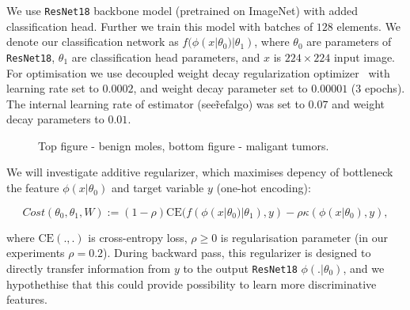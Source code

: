 \documentclass{article}
\newcommand{\CE}{\mathrm{CE}}
\begin{document}
We use \verb|ResNet18| backbone model (pretrained on ImageNet) with added classification head. Further we train this model with batches of $128$ elements.
We denote our classification network as $f(\phi(x|\theta_{0})|\theta_{1})$, where $\theta_{0}$ are parameters of \verb|ResNet18|, $\theta_{1}$ are classification head parameters, and $x$ is $224\times 224$ input image.
For optimisation we use decoupled weight decay regularization optimizer~\cite{Loshchilov2019DecoupledWD} with learning rate set to $0.0002$, and weight decay parameter set to $0.00001$ ($3$ epochs).
The internal learning rate of estimator (see\~ref{algo}) was set to $0.07$ and weight decay parameters to $0.01$.

\begin{figure}%
	\centering
	\qquad
	\caption{Top figure - benign moles, bottom figure - maligant tumors.}
	\label{fig:Pneumonia_dataset_examples}
\end{figure}


We will investigate additive regularizer, which maximises depency of bottleneck the feature $\phi(x|\theta_{0})$ and target variable $y$ (one-hot encoding): 


\begin{equation}
\label{eq:regularizer1}
Cost(\theta_{0},\theta_{1}, W) := (1-\rho)\CE(f(\phi(x|\theta_{0})|\theta_{1}),y) - \rho \kappa(\phi(x|\theta_{0}),y),
\end{equation}

\noindent where $\CE(.,.)$ is cross-entropy loss, $\rho \geq 0$ is regularisation parameter (in our experiments $\rho = 0.2$). During backward pass, this regularizer is designed to directly transfer information from $y$ to the output \verb|ResNet18| $\phi(.|\theta_{0})$, and we hypothethise that this could provide possibility to learn more discriminative features.
\end{document}
